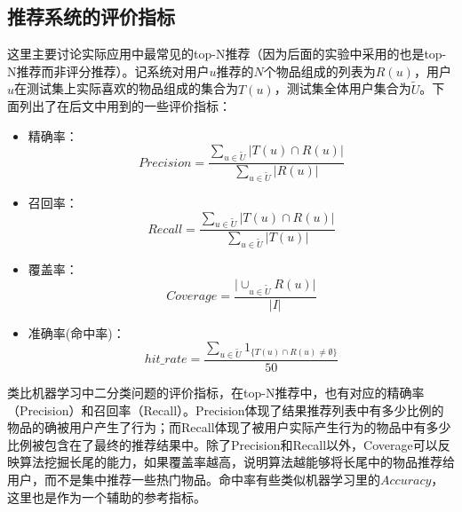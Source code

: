 \documentclass{article}
\begin{document}
	\subsection{推荐系统的评价指标}
	这里主要讨论实际应用中最常见的top-N推荐（因为后面的实验中采用的也是top-N推荐而非评分推荐）。记系统对用户$u$推荐的$N$个物品组成的列表为$R(u)$，用户$u$在测试集上实际喜欢的物品组成的集合为$T(u)$，测试集全体用户集合为$\tilde{U}$。下面列出了在后文中用到的一些评价指标：
	\begin{itemize}
	\item 精确率：$$Precision = \frac{\sum\limits_{u\in\tilde{U}}|T(u)\cap R(u)|}{\sum\limits_{u\in\tilde{U}}|R(u)|}$$
	\item 召回率：$$Recall = \frac{\sum\limits_{u\in\tilde{U}}|T(u)\cap R(u)|}{\sum\limits_{u\in\tilde{U}}|T(u)|}$$
	\item 覆盖率：$$Coverage = \frac{\big|\cup_{u\in\tilde{U}}R(u)\big|}{|I|}$$
	\item 准确率(命中率)：$$hit\_rate=\frac{\sum\limits_{u\in\tilde{U}}1_{\{T(u)\cap R(u) \neq\emptyset\}}}{50}$$
	\end{itemize}

	类比机器学习中二分类问题的评价指标，在top-N推荐中，也有对应的精确率（Precision）和召回率（Recall）。Precision体现了结果推荐列表中有多少比例的物品的确被用户产生了行为；而Recall体现了被用户实际产生行为的物品中有多少比例被包含在了最终的推荐结果中。除了Precision和Recall以外，Coverage可以反映算法挖掘长尾的能力，如果覆盖率越高，说明算法越能够将长尾中的物品推荐给用户，而不是集中推荐一些热门物品。命中率有些类似机器学习里的$Accuracy$，这里也是作为一个辅助的参考指标。
\end{document}
